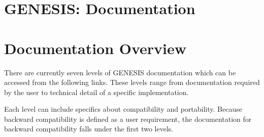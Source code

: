 \documentclass[12pt]{article}
\begin{document}
\section*{GENESIS: Documentation}

\section*{Documentation Overview}

There are currently seven levels of GENESIS documentation which can be
accessed from the following links.  These levels range from
documentation required by the user to technical detail of a specific
implementation.

Each level can include specifics about compatibility and portability.
Because backward compatibility is defined as a user requirement, the
documentation for backward compatibility falls under the first two
levels.
\end{document}
